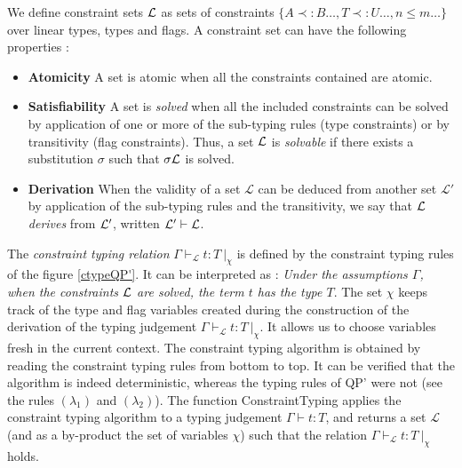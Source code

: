 \begin{defn} We define constraint sets $\mathcal{L}$ as sets of constraints $\{ A \prec: B \dots, T \prec: U \dots, n \le m \dots\}$
	over linear types, types and flags.
  A constraint set can have the following properties :
  \begin{itemize}
  	\item[]{\bf Atomicity} A set is atomic when all the constraints contained are atomic.
  	\item[]{\bf Satisfiability} A set is \textit{solved} when all the included constraints can be solved by application of one or
  		more of the sub-typing rules (type constraints) or by transitivity (flag constraints).
  		Thus, a set $\mathcal{L}$ is \textit{solvable} if there exists a substitution $\sigma$ such that $\sigma \mathcal{L}$ is solved.
	 	\item[]{\bf Derivation} When the validity of a set $\mathcal{L}$ can be deduced from another set $\mathcal{L'}$ by application of
		  the sub-typing rules and the transitivity, we say that $\mathcal{L}$ \textit{derives} from $\mathcal{L}'$,
		  written $\mathcal{L}' \vdash \mathcal{L}$.
  \end{itemize}
\end{defn}

\begin{defn} The \textit{constraint typing relation} $\Gamma \vdash_\mathcal{L} t : T ~|_\chi$ is defined by the constraint typing rules
	of the figure \ref{ctypeQP'}. It can be interpreted as : \textit{Under the assumptions $\Gamma$, when the constraints $\mathcal{L}$ are solved,
	the term $t$ has the type $T$}. The set $\chi$ keeps track of the type and flag variables created during the construction of the derivation
	of the typing judgement $\Gamma \vdash_\mathcal{L} t : T ~|_\chi$. It allows us to choose variables fresh in the current context.
  The constraint typing algorithm is obtained by reading the constraint typing rules from bottom to top. It can be verified that
  the algorithm is indeed deterministic, whereas the typing rules of QP' were not (see the rules $(\lambda_1)$ and $(\lambda_2)$).
  The function ConstraintTyping applies the constraint typing algorithm to a typing judgement $\Gamma \vdash t : T$, and returns a set
  $\mathcal{L}$ (and as a by-product the set of variables $\chi$) such that the relation $\Gamma \vdash_\mathcal{L} t : T ~|_\chi$ holds.
\end{defn}
	
